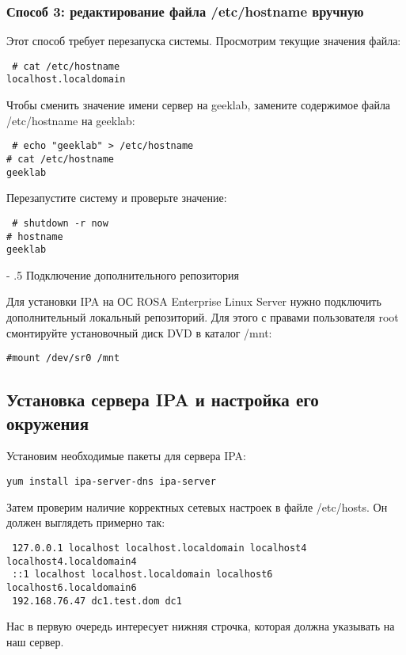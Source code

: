 \documentclass[a4paper,10pt,twoside]{article}
\makeatletter
\renewcommand\paragraph{%
   \@startsection{paragraph}{4}{0mm}%
      {-\baselineskip}%
      {.5\baselineskip}%
      {\normalfont\normalsize\bfseries}}
\makeatother
\begin{document}
\subsubsection{Способ 3: редактирование файла /etc/hostname вручную}
Этот способ требует перезапуска системы. Просмотрим текущие значения файла:
\begin{verbatim}
 # cat /etc/hostname
localhost.localdomain
\end{verbatim} 

Чтобы сменить значение имени сервер на geeklab, замените содержимое файла /etc/hostname на geeklab:
\begin{verbatim}
 # echo "geeklab" > /etc/hostname
# cat /etc/hostname
geeklab
\end{verbatim} 

Перезапустите систему и проверьте значение:
\begin{verbatim}
 # shutdown -r now
# hostname
geeklab
\end{verbatim} 

\paragraph{Подключение дополнительного репозитория}

Для установки IPA на ОС ROSA Enterprise Linux Server нужно подключить дополнительный локальный репозиторий. Для этого с правами пользователя root смонтируйте установочный диск DVD в каталог /mnt:
\begin{verbatim}
#mount /dev/sr0 /mnt
\end{verbatim}

\subsection{Установка сервера IPA и настройка его окружения}
Установим необходимые пакеты для сервера IPA:
\begin{verbatim}
yum install ipa-server-dns ipa-server
\end{verbatim} 

Затем проверим наличие корректных сетевых настроек в файле /etc/hosts. Он должен выглядеть примерно так:
\begin{verbatim}
 127.0.0.1 localhost localhost.localdomain localhost4 localhost4.localdomain4
 ::1 localhost localhost.localdomain localhost6 localhost6.localdomain6
 192.168.76.47 dc1.test.dom dc1
 \end{verbatim} 
 
Нас в первую очередь интересует нижняя строчка, которая должна указывать на наш сервер.
\end{document}

